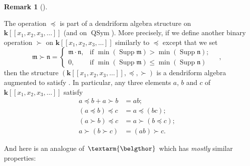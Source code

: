 \documentclass
[numbers=enddot,12pt,final,onecolumn,notitlepage,abstracton]{scrartcl}%
\theoremstyle{definition}
\newtheorem{remk}[theo]{Remark}
\newenvironment{remark}[1][]
{\begin{remk}[#1]\begin{leftbar}}
{\end{leftbar}\end{remk}}
\newenvironment{verlong}{}{}
\newcommand{\bel}{\left. \textarm{\belgthor} \right.}
\begin{document}
\begin{verlong}
\begin{remark}
The operation $\left.  \preceq\right.  $ is part of a dendriform algebra
structure on $\mathbf{k}\left[  \left[  x_{1},x_{2},x_{3},\ldots\right]
\right]  $ (and on $\operatorname*{QSym}$). More precisely, if we define
another binary operation $\left.  \succ\right.  $ on $\mathbf{k}\left[
\left[  x_{1},x_{2},x_{3},\ldots\right]  \right]  $ similarly to $\left.
\preceq\right.  $ except that we set%
\[
\mathfrak{m}\left.  \succ\right.  \mathfrak{n}=
\begin{cases}
\mathfrak{m}\cdot\mathfrak{n}, & \text{if }\min\left(  \operatorname*{Supp}%
\mathfrak{m}\right)  >\min\left(  \operatorname*{Supp}\mathfrak{n}\right)  ;\\
0, & \text{if }\min\left(  \operatorname*{Supp}\mathfrak{m}\right)  \leq
\min\left(  \operatorname*{Supp}\mathfrak{n}\right)
\end{cases}
\quad,
\]
then the structure $\left(  \mathbf{k}\left[  \left[  x_{1},x_{2},x_{3}%
,\ldots\right]  \right]  ,\left.  \preceq\right.  ,\left.  \succ\right.
\right)  $ is a dendriform algebra augmented to satisfy \cite[(15)]{EbrFar08}.
In particular, any three elements $a$, $b$ and $c$ of $\mathbf{k}\left[
\left[  x_{1},x_{2},x_{3},\ldots\right]  \right]  $ satisfy%
\begin{align*}
a\left.  \preceq\right.  b+a\left.  \succ\right.  b  &  =ab;\\
\left(  a\left.  \preceq\right.  b\right)  \left.  \preceq\right.  c  &
=a\left.  \preceq\right.  \left(  bc\right)  ;\\
\left(  a\left.  \succ\right.  b\right)  \left.  \preceq\right.  c  &
=a\left.  \succ\right.  \left(  b\left.  \preceq\right.  c\right)  ;\\
a\left.  \succ\right.  \left(  b\left.  \succ\right.  c\right)   &  =\left(
ab\right)  \left.  \succ\right.  c.
\end{align*}

\end{remark}

And here is an analogue of $\bel $ which has \textit{mostly} similar properties:


\end{verlong}
\end{document}

